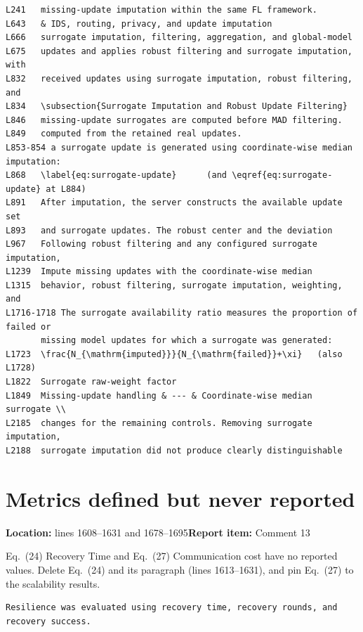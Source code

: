 \documentclass[10pt,a4paper]{article}
\newcommand{\issue}[3]{\section{#1}{\raggedright\noindent\textcolor{note}{\small\textbf{Location:} #2\quad\textbf{Report item:} #3}\par}\smallskip}
\newcommand{\why}[1]{\noindent\textcolor{note}{\small #1}\par\smallskip}
\begin{document}
\begin{after}
\begin{Verbatim}
L241   missing-update imputation within the same FL framework.
L643   & IDS, routing, privacy, and update imputation
L666   surrogate imputation, filtering, aggregation, and global-model
L675   updates and applies robust filtering and surrogate imputation, with
L832   received updates using surrogate imputation, robust filtering, and
L834   \subsection{Surrogate Imputation and Robust Update Filtering}
L846   missing-update surrogates are computed before MAD filtering.
L849   computed from the retained real updates.
L853-854 a surrogate update is generated using coordinate-wise median imputation:
L868   \label{eq:surrogate-update}      (and \eqref{eq:surrogate-update} at L884)
L891   After imputation, the server constructs the available update set
L893   and surrogate updates. The robust center and the deviation
L967   Following robust filtering and any configured surrogate imputation,
L1239  Impute missing updates with the coordinate-wise median
L1315  behavior, robust filtering, surrogate imputation, weighting, and
L1716-1718 The surrogate availability ratio measures the proportion of failed or
       missing model updates for which a surrogate was generated:
L1723  \frac{N_{\mathrm{imputed}}}{N_{\mathrm{failed}}+\xi}   (also L1728)
L1822  Surrogate raw-weight factor
L1849  Missing-update handling & --- & Coordinate-wise median surrogate \\
L2185  changes for the remaining controls. Removing surrogate imputation,
L2188  surrogate imputation did not produce clearly distinguishable
\end{Verbatim}
\end{after}

\issue{Metrics defined but never reported}{lines 1608--1631 and 1678--1695}{Comment 13}
\why{Eq.~(24) Recovery Time and Eq.~(27) Communication cost have no reported values. Delete Eq.~(24) and its paragraph (lines 1613--1631), and pin Eq.~(27) to the scalability results.}

\begin{before}[lines 1608--1609]
\begin{Verbatim}
Resilience was evaluated using recovery time, recovery rounds, and
recovery success.
\end{Verbatim}
\end{before}
\end{document}
